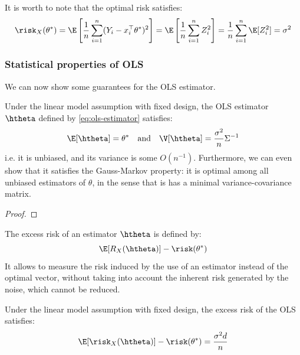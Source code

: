 \documentclass{../cs-classes/cs-classes}
\begin{document}
\begin{remark}
    It is worth to note that the optimal risk satisfies:
    \begin{equation*}
        \risk_X(\theta^*) = \E\left[\frac{1}{n}\sum_{i=1}^n(Y_i-x_i^\top\theta^*)^2\right] = \E\left[\frac{1}{n}\sum_{i=1}^nZ_i^2\right] = \frac{1}{n}\sum_{i=1}^n\E[Z_i^2]=\sigma^2
    \end{equation*}
\end{remark}

\subsubsection{Statistical properties of OLS}
We can now show some guarantees for the OLS estimator.

\begin{property}
    Under the linear model assumption with fixed design, the OLS estimator $\htheta$ defined by \eqref{eq:ols-estimator} satisfies:
    \begin{equation*}
        \E[\htheta] = \theta^* \quad \textnormal{and} \quad \V[\htheta] = \frac{\sigma^2}{n}\Sigma^{-1}
    \end{equation*}
    i.e. it is unbiased, and its variance is some $O(n^{-1})$. Furthermore, we can even show that it satisfies the Gauss-Markov property: it is optimal among all unbiased estimators of $\theta$, in the sense that is has a minimal variance-covariance matrix.
\end{property}

\begin{proof}
\end{proof}

\begin{definition}
    The excess risk of an estimator $\htheta$ is defined by:
    \begin{equation}
        \E[R_X(\htheta)]-\risk(\theta^*)
    \end{equation}
    It allows to measure the risk induced by the use of an estimator instead of the optimal vector, without taking into account the inherent risk generated by the noise, which cannot be reduced.
\end{definition}

\begin{corollary}
    Under the linear model assumption with fixed design, the excess risk of the OLS satisfies:
    \begin{equation*}
        \E[\risk_X(\htheta)]-\risk(\theta^*)=\frac{\sigma^2d}{n}
    \end{equation*}
\end{corollary}
\end{document}
